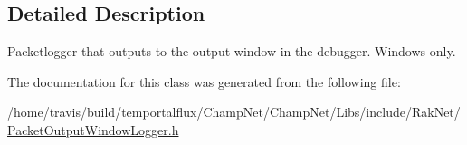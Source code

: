 \subsection{Detailed Description}
Packetlogger that outputs to the output window in the debugger. Windows only. 

The documentation for this class was generated from the following file\-:\begin{DoxyCompactItemize}
\item 
/home/travis/build/temportalflux/\-Champ\-Net/\-Champ\-Net/\-Libs/include/\-Rak\-Net/\hyperlink{_packet_output_window_logger_8h}{Packet\-Output\-Window\-Logger.\-h}\end{DoxyCompactItemize}
